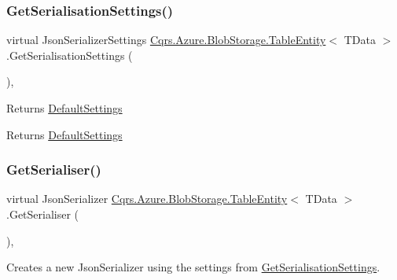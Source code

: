 \subsubsection{\texorpdfstring{Get\+Serialisation\+Settings()}{GetSerialisationSettings()}}
{\footnotesize\ttfamily virtual Json\+Serializer\+Settings \hyperlink{classCqrs_1_1Azure_1_1BlobStorage_1_1TableEntity}{Cqrs.\+Azure.\+Blob\+Storage.\+Table\+Entity}$<$ T\+Data $>$.Get\+Serialisation\+Settings (\begin{DoxyParamCaption}{ }\end{DoxyParamCaption})\hspace{0.3cm}{\ttfamily [protected]}, {\ttfamily [virtual]}}



Returns \hyperlink{classCqrs_1_1Azure_1_1BlobStorage_1_1TableEntity_ab7a9041c7d8e5237cfb81ad98b6b3980_ab7a9041c7d8e5237cfb81ad98b6b3980}{Default\+Settings} 

\begin{DoxyReturn}{Returns}
\hyperlink{classCqrs_1_1Azure_1_1BlobStorage_1_1TableEntity_ab7a9041c7d8e5237cfb81ad98b6b3980_ab7a9041c7d8e5237cfb81ad98b6b3980}{Default\+Settings}
\end{DoxyReturn}
\mbox{\label{classCqrs_1_1Azure_1_1BlobStorage_1_1TableEntity_a18d1b7ecf408a921cd0e2e6a8d0f6c74_a18d1b7ecf408a921cd0e2e6a8d0f6c74}} 
\subsubsection{\texorpdfstring{Get\+Serialiser()}{GetSerialiser()}}
{\footnotesize\ttfamily virtual Json\+Serializer \hyperlink{classCqrs_1_1Azure_1_1BlobStorage_1_1TableEntity}{Cqrs.\+Azure.\+Blob\+Storage.\+Table\+Entity}$<$ T\+Data $>$.Get\+Serialiser (\begin{DoxyParamCaption}{ }\end{DoxyParamCaption})\hspace{0.3cm}{\ttfamily [protected]}, {\ttfamily [virtual]}}



Creates a new Json\+Serializer using the settings from \hyperlink{classCqrs_1_1Azure_1_1BlobStorage_1_1TableEntity_aa36736f412df5a1667d7b0e5c0bd3035_aa36736f412df5a1667d7b0e5c0bd3035}{Get\+Serialisation\+Settings}. 

